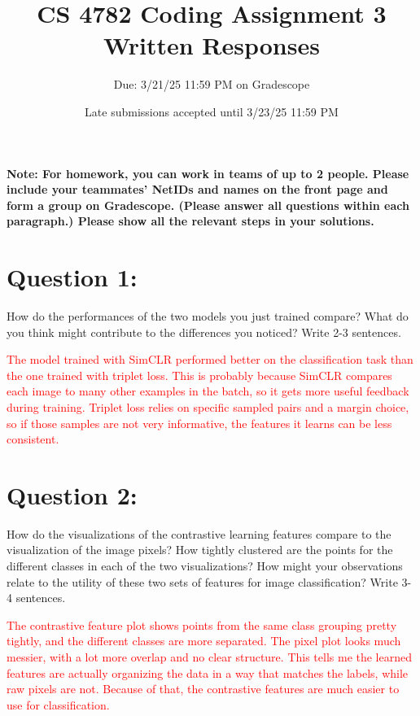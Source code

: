 \documentclass{article}
\title{CS 4782 Coding Assignment 3 Written Responses\vspace{-10pt}}
\author{Due: 3/21/25 11:59 PM on Gradescope}
\date{Late submissions accepted until 3/23/25 11:59 PM}
\begin{document}
    \maketitle
    \textbf{Note: For homework, you can work in teams of up to 2 people. Please include your teammates’ NetIDs and names on the front page and form a group on Gradescope. (Please answer all questions within each paragraph.) Please show all the relevant steps in your solutions. }
\maketitle
\section*{Question 1:}

How do the performances of the two models you just trained compare? What do you think might contribute to the differences you noticed? Write 2-3 sentences.

\textcolor{Red}{The model trained with SimCLR performed better on the classification task than the one trained with triplet loss. This is probably because SimCLR compares each image to many other examples in the batch, so it gets more useful feedback during training. Triplet loss relies on specific sampled pairs and a margin choice, so if those samples are not very informative, the features it learns can be less consistent.}

\section*{Question 2:}

How do the visualizations of the contrastive learning features compare to the visualization of the image pixels? How tightly clustered are the points for the different classes in each of the two visualizations? How might your observations relate to the utility of these two sets of features for image classification? Write 3-4 sentences.

\textcolor{Red}{The contrastive feature plot shows points from the same class grouping pretty tightly, and the different classes are more separated. The pixel plot looks much messier, with a lot more overlap and no clear structure. This tells me the learned features are actually organizing the data in a way that matches the labels, while raw pixels are not. Because of that, the contrastive features are much easier to use for classification.}
\end{document}
